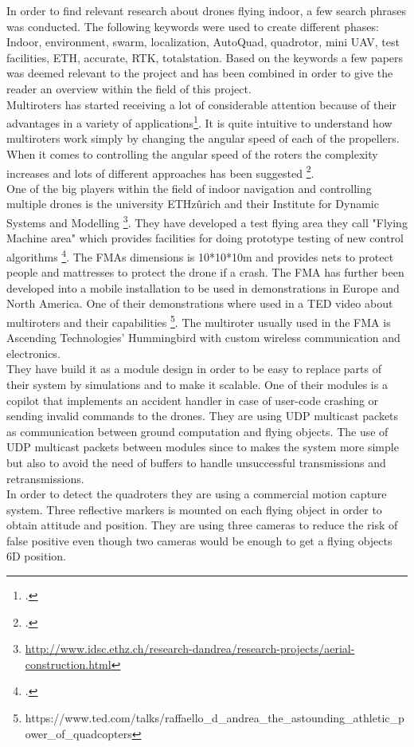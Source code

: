 In order to find relevant research about drones flying indoor, a few search phrases was conducted.
The following keywords were used to create different phases: Indoor, environment, swarm, localization, AutoQuad, quadrotor, mini UAV, test facilities, ETH, accurate, RTK, totalstation.
Based on the keywords a few papers was deemed relevant to the project and has been combined in order to give the reader an overview within the field of this project. \\


Multiroters has started receiving a lot of considerable attention because of their advantages in a variety of applications\footcite{kang2015indoor}. It is quite intuitive to understand how multiroters work simply by changing the angular speed of each of the propellers. When it comes to controlling the angular speed of the roters the complexity increases and lots of different approaches has been suggested \footcite{luukkonen2011modelling}. \\


One of the big players within the field of indoor navigation and controlling multiple drones is the university ETHzûrich and their Institute for Dynamic Systems and Modelling \footnote{\url{http://www.idsc.ethz.ch/research-dandrea/research-projects/aerial-construction.html}}. They have developed a test flying area they call "Flying Machine area" which provides facilities for doing prototype testing of new control algorithms \footcite{lupashin2014platform}. The FMAs dimensions is 10*10*10m and provides nets to protect people and mattresses to protect the drone  if a crash. The FMA has further been developed into a mobile installation to be used in demonstrations in Europe and North America. One of their demonstrations where used in a TED video about multiroters and their capabilities \footnote{https://www.ted.com/talks/raffaello\_d\_andrea\_the\_astounding\_athletic\_power\_of\_quadcopters}.
The multiroter usually used in the FMA is Ascending Technologies' Hummingbird with custom wireless communication and electronics. \\
They have build it as a module design in order to be easy to replace parts of their system by simulations and to make it scalable.
One of their modules is a copilot that implements an accident handler in case of user-code crashing or sending invalid commands to the drones.
They are using UDP multicast packets as communication between ground computation and flying objects. The use of UDP multicast packets between modules since to makes the system more simple but also to avoid the need of buffers to handle unsuccessful transmissions and retransmissions. \\
In order to detect the quadroters they are using a commercial motion capture system. Three reflective markers is mounted on each flying object in order to obtain attitude and position. They are using three cameras to reduce the risk of false positive even though two cameras would be enough to get a flying objects 6D position.\\
 
